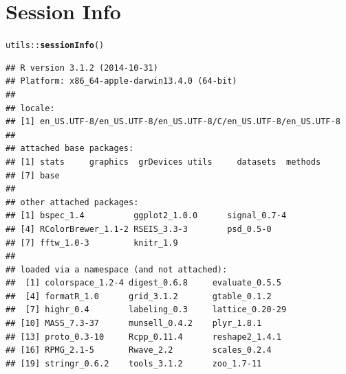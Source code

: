 \documentclass[10pt]{article}\usepackage[]{graphicx}\usepackage[]{color}
\makeatletter
\newcommand{\hlopt}[1]{\textcolor[rgb]{0,0,0}{#1}}%
\newcommand{\hlstd}[1]{\textcolor[rgb]{0.345,0.345,0.345}{#1}}%
\newcommand{\hlkwd}[1]{\textcolor[rgb]{0.737,0.353,0.396}{\textbf{#1}}}%
\newenvironment{kframe}{%
 \def\at@end@of@kframe{}%
 \ifinner\ifhmode%
  \def\at@end@of@kframe{\end{minipage}}%
  \begin{minipage}{\columnwidth}%
 \fi\fi%
 \def\FrameCommand##1{\hskip\@totalleftmargin \hskip-\fboxsep
 \colorbox{shadecolor}{##1}\hskip-\fboxsep
     \hskip-\linewidth \hskip-\@totalleftmargin \hskip\columnwidth}%
 \MakeFramed {\advance\hsize-\width
   \@totalleftmargin\z@ \linewidth\hsize
   \@setminipage}}%
 {\par\unskip\endMakeFramed%
 \at@end@of@kframe}
\newenvironment{knitrout}{}{} %
\makeatother
\begin{document}
\section*{Session Info}
\begin{knitrout}\small
{}\color{fgcolor}\begin{kframe}
\begin{alltt}
\hlstd{utils}\hlopt{::}\hlkwd{sessionInfo}\hlstd{()}
\end{alltt}
\begin{verbatim}
## R version 3.1.2 (2014-10-31)
## Platform: x86_64-apple-darwin13.4.0 (64-bit)
## 
## locale:
## [1] en_US.UTF-8/en_US.UTF-8/en_US.UTF-8/C/en_US.UTF-8/en_US.UTF-8
## 
## attached base packages:
## [1] stats     graphics  grDevices utils     datasets  methods  
## [7] base     
## 
## other attached packages:
## [1] bspec_1.4          ggplot2_1.0.0      signal_0.7-4      
## [4] RColorBrewer_1.1-2 RSEIS_3.3-3        psd_0.5-0         
## [7] fftw_1.0-3         knitr_1.9         
## 
## loaded via a namespace (and not attached):
##  [1] colorspace_1.2-4 digest_0.6.8     evaluate_0.5.5  
##  [4] formatR_1.0      grid_3.1.2       gtable_0.1.2    
##  [7] highr_0.4        labeling_0.3     lattice_0.20-29 
## [10] MASS_7.3-37      munsell_0.4.2    plyr_1.8.1      
## [13] proto_0.3-10     Rcpp_0.11.4      reshape2_1.4.1  
## [16] RPMG_2.1-5       Rwave_2.2        scales_0.2.4    
## [19] stringr_0.6.2    tools_3.1.2      zoo_1.7-11
\end{verbatim}
\end{kframe}
\end{knitrout}


\end{document}
